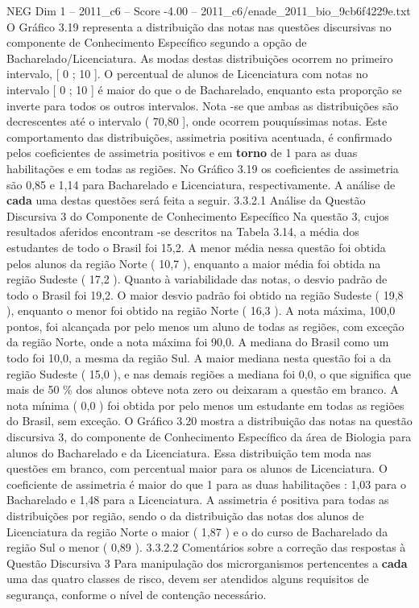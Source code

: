 \begin{textsample}{NEG Dim 1 – 2011\_c6 – Score -4.00 – 2011\_c6/enade\_2011\_bio\_9cb6f4229e.txt}
O Gráfico 3.19 representa a distribuição das notas nas questões discursivas no componente de Conhecimento Específico segundo a opção de Bacharelado/Licenciatura.
As modas destas distribuições ocorrem no primeiro intervalo, [ 0 ; 10 ].
O percentual de alunos de Licenciatura com notas no intervalo [ 0 ; 10 ] é maior do que o de Bacharelado, enquanto esta proporção se inverte para todos os outros intervalos.
Nota -se que ambas as distribuições são decrescentes até o intervalo ( 70,80 ], onde ocorrem pouquíssimas notas.
Este comportamento das distribuições, assimetria positiva acentuada, é confirmado pelos coeficientes de assimetria positivos e em \textbf{torno} de 1 para as duas habilitações e em todas as regiões.
No Gráfico 3.19 os coeficientes de assimetria são 0,85 e 1,14 para Bacharelado e Licenciatura, respectivamente.
A análise de \textbf{cada} uma destas questões será feita a seguir. 3.3.2.1 Análise da Questão Discursiva 3 do Componente de Conhecimento Específico Na questão 3, cujos resultados aferidos encontram -se descritos na Tabela 3.14, a média dos estudantes de todo o Brasil foi 15,2.
A menor média nessa questão foi obtida pelos alunos da região Norte ( 10,7 ), enquanto a maior média foi obtida na região Sudeste ( 17,2 ).
Quanto à variabilidade das notas, o desvio padrão de todo o Brasil foi 19,2.
O maior desvio padrão foi obtido na região Sudeste ( 19,8 ), enquanto o menor foi obtido na região Norte ( 16,3 ).
A nota máxima, 100,0 pontos, foi alcançada por pelo menos um aluno de todas as regiões, com exceção da região Norte, onde a nota máxima foi 90,0.
A mediana do Brasil como um todo foi 10,0, a mesma da região Sul.
A maior mediana nesta questão foi a da região Sudeste ( 15,0 ), e nas demais regiões a mediana foi 0,0, o que significa que mais de 50 \% dos alunos obteve nota zero ou deixaram a questão em branco.
A nota mínima ( 0,0 ) foi obtida por pelo menos um estudante em todas as regiões do Brasil, sem exceção.
O Gráfico 3.20 mostra a distribuição das notas na questão discursiva 3, do componente de Conhecimento Específico da área de Biologia para alunos do Bacharelado e da Licenciatura.
Essa distribuição tem moda nas questões em branco, com percentual maior para os alunos de Licenciatura.
O coeficiente de assimetria é maior do que 1 para as duas habilitações : 1,03 para o Bacharelado e 1,48 para a Licenciatura.
A assimetria é positiva para todas as distribuições por região, sendo o da distribuição das notas dos alunos de Licenciatura da região Norte o maior ( 1,87 ) e o do curso de Bacharelado da região Sul o menor ( 0,89 ). 3.3.2.2 Comentários sobre a correção das respostas à Questão Discursiva 3 Para manipulação dos microrganismos pertencentes a \textbf{cada} uma das quatro classes de risco, devem ser atendidos alguns requisitos de segurança, conforme o nível de contenção necessário.

\end{textsample}

